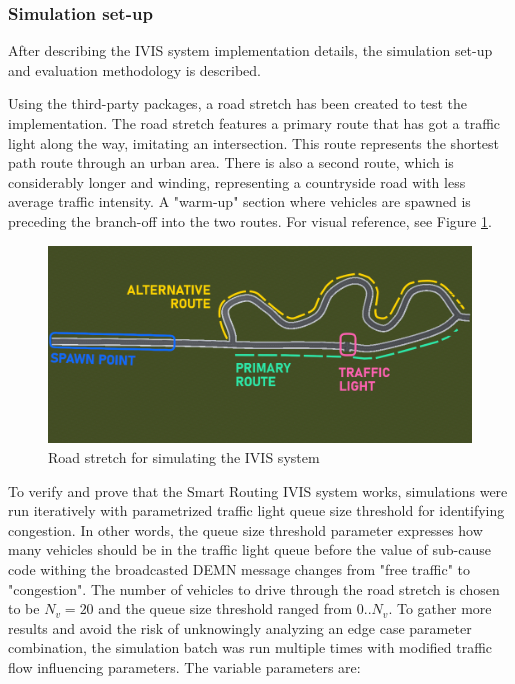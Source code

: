 \documentclass[0main.tex]{subfiles}
\begin{document}
\subsubsection{Simulation set-up}

After describing the IVIS system implementation details, the simulation set-up and evaluation
methodology is described. 

Using the third-party packages, a road stretch has been created to test the implementation.
The road stretch features a primary route that has got a traffic light along the way, imitating 
an intersection. This route represents the shortest path route through an urban area. 
There is also a second route, which is considerably longer and winding, representing a countryside 
road with less average traffic intensity. A "warm-up" section where vehicles are spawned is
preceding the branch-off into the two routes. For visual reference, see Figure
\ref{fig-routeMap}.

\begin{figure}[htbp]
    \centering
    \includegraphics[width=.9\textwidth]{test-route-map-legend.png}
    \caption{Road stretch for simulating the IVIS system}
    \label{fig-routeMap}
\end{figure}

To verify and prove that the Smart Routing IVIS system works, simulations were run iteratively
with parametrized traffic light queue size threshold for identifying congestion. In other
words, the queue size threshold parameter expresses how many vehicles should be in the traffic
light queue before the value of sub-cause code withing the broadcasted DEMN message changes
from "free traffic" to "congestion". The number of vehicles to drive through the road stretch
is chosen to be $N_v = 20 $ and the queue size threshold ranged from $0..N_v$. To gather more
results and avoid the risk of unknowingly analyzing an edge case parameter combination, the
simulation batch was run multiple times with modified traffic flow influencing parameters. The
variable parameters are:
\end{document}

